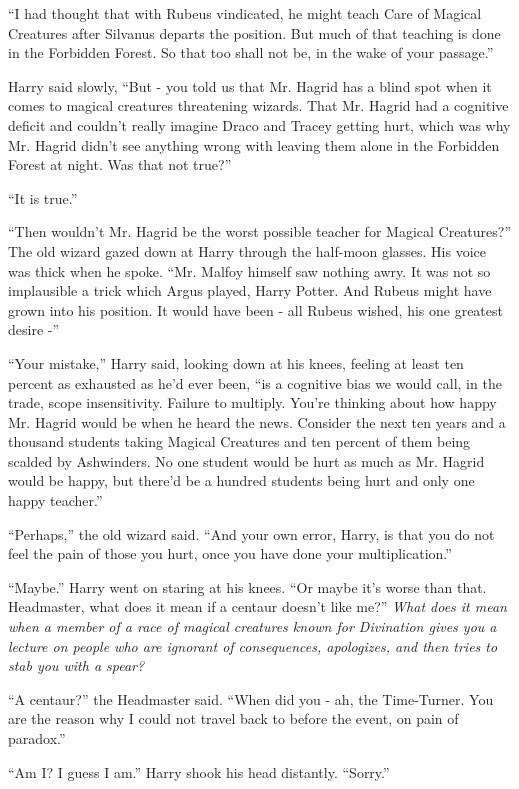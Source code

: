 ``I had thought that with Rubeus vindicated, he might teach Care of Magical Creatures after Silvanus departs the position. But much of that teaching is done in the Forbidden Forest. So that too shall not be, in the wake of your passage.''

Harry said slowly, ``But - you told us that Mr. Hagrid has a blind spot when it comes to magical creatures threatening wizards. That Mr. Hagrid had a cognitive deficit and couldn't really imagine Draco and Tracey getting hurt, which was why Mr. Hagrid didn't see anything wrong with leaving them alone in the Forbidden Forest at night. Was that not true?''

``It is true.''

``Then wouldn't Mr. Hagrid be the worst possible teacher for Magical Creatures?''
The old wizard gazed down at Harry through the half-moon glasses. His voice was thick when he spoke. ``Mr. Malfoy himself saw nothing awry. It was not so implausible a trick which Argus played, Harry Potter. And Rubeus might have grown into his position. It would have been - all Rubeus wished, his one greatest desire -''

``Your mistake,'' Harry said, looking down at his knees, feeling at least ten percent as exhausted as he'd ever been, ``is a cognitive bias we would call, in the trade, scope insensitivity. Failure to multiply. You're thinking about how happy Mr. Hagrid would be when he heard the news. Consider the next ten years and a thousand students taking Magical Creatures and ten percent of them being scalded by Ashwinders. No one student would be hurt as much as Mr. Hagrid would be happy, but there'd be a hundred students being hurt and only one happy teacher.''

``Perhaps,'' the old wizard said. ``And your own error, Harry, is that you do not feel the pain of those you hurt, once you have done your multiplication.''

``Maybe.'' Harry went on staring at his knees. ``Or maybe it's worse than that. Headmaster, what does it mean if a centaur doesn't like me?'' \emph{What does it mean when a member of a race of magical creatures known for Divination gives you a lecture on people who are ignorant of consequences, apologizes, and then tries to stab you with a spear?}

``A centaur?'' the Headmaster said. ``When did you - ah, the Time-Turner. You are the reason why I could not travel back to before the event, on pain of paradox.''

``Am I? I guess I am.'' Harry shook his head distantly. ``Sorry.''

